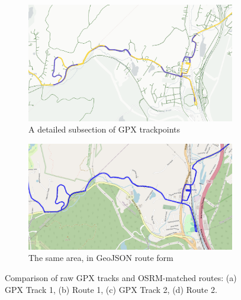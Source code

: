 \documentclass[11pt,a4paper]{article}
\begin{document}
\begin{figure}[H]
	\begin{subfigure}[b]{0.48\textwidth}
		\centering
		\includegraphics[width=\textwidth]{track2_gpx.png}
		\caption{A detailed subsection of GPX trackpoints}
		\label{fig:gpx2}
	\end{subfigure}
	\hfill
	\begin{subfigure}[b]{0.48\textwidth}
		\centering
		\includegraphics[width=\textwidth]{track2_route.png}
		\caption{The same area, in GeoJSON route form}
		\label{fig:route2}
	\end{subfigure}

	\caption{Comparison of raw GPX tracks and OSRM-matched routes: (a) GPX Track 1, (b) Route 1, (c) GPX Track 2, (d) Route 2.}
	\label{fig:gpx_vs_route_grid}
\end{figure}
\end{document}
